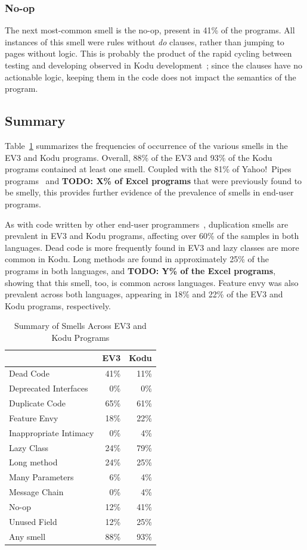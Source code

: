 \documentclass{sig-alternate}
\newcommand{\todo}[1]{\textbf{TODO: #1}}
\begin{document}
\subsubsection{No-op}
The next most-common smell is the no-op, present in 41\% of the programs. All instances of this smell were rules without \emph{do} clauses, rather than jumping to pages without logic. This is probably the product of the rapid cycling between testing and developing observed in Kodu development~\cite{Stolee:2011:ECS:1953163.1953197}; since the clauses have no actionable logic, keeping them in the code does not impact the semantics of the program. 

\subsection{Summary}
Table~\ref{tab:smellsummary} summarizes the frequencies of occurrence of the various smells in the  EV3 and Kodu programs. Overall, 88\% of the EV3 and 93\% of the Kodu programs contained at least one smell. Coupled with the 81\% of Yahoo!\ Pipes programs~\cite{StoleeTSE2013} and \todo{X\% of Excel programs} that were previously found to be smelly, this provides further evidence of the prevalence of smells in end-user programs. 

As with code written by other end-user programmers~\cite{StoleeTSE2013}, duplication smells are prevalent in EV3 and Kodu programs, affecting over 60\% of the samples in both languages. Dead code is more frequently found in EV3 and lazy classes are more common in Kodu. Long methods are found in approximately 25\% of the programs in both languages, and \todo{Y\% of the Excel programs}, showing that this smell, too, is common across languages. Feature envy was also prevalent across both languages, appearing in 18\% and 22\% of the EV3 and Kodu programs, respectively. 


\begin{table}
\caption{Summary of Smells Across EV3 and Kodu Programs \label{tab:smellsummary}}
\begin{center}
\begin{tabular}{l | r r}
&EV3&Kodu\\ \hline
Dead Code&41\%&11\%\\
Deprecated Interfaces & 0\% & 0\%\\
Duplicate Code&65\%&61\%\\
Feature Envy&18\%&22\%\\
Inappropriate Intimacy&0\%&4\%\\
Lazy Class&24\%&79\%\\
Long method&24\%&25\%\\
Many Parameters&6\%&4\%\\
Message Chain&0\%&4\%\\
No-op&12\%&41\%\\
Unused Field&12\%&25\%\\ \hline
Any smell & 88\% & 93\%
\end{tabular}
\end{center}
\end{table}
\end{document}
